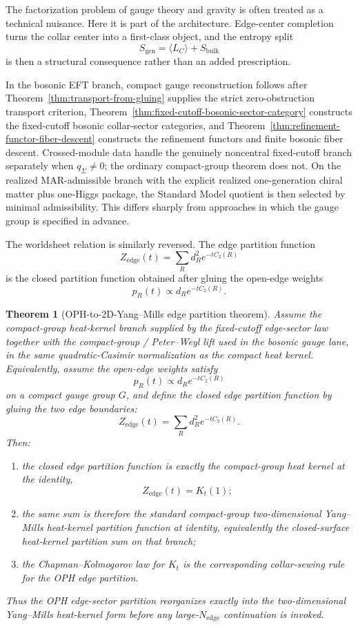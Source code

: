\documentclass[11pt]{article}
\newtheorem{theorem}{Theorem}[section]
\begin{document}
The factorization problem of gauge theory and gravity is often treated as a technical nuisance. Here it is part of the architecture. Edge-center completion turns the collar center into a first-class object, and the entropy split
\[
S_{\mathrm{gen}}=\langle L_C\rangle + S_{\mathrm{bulk}}
\]
is then a structural consequence rather than an added prescription.

In the bosonic EFT branch, compact gauge reconstruction follows after Theorem~\ref{thm:transport-from-gluing} supplies the strict zero-obstruction transport criterion, Theorem~\ref{thm:fixed-cutoff-bosonic-sector-category} constructs the fixed-cutoff bosonic collar-sector categories, and Theorem~\ref{thm:refinement-functor-fiber-descent} constructs the refinement functors and finite bosonic fiber descent. Crossed-module data handle the genuinely noncentral fixed-cutoff branch separately when \(q_\Sigma\ne0\); the ordinary compact-group theorem does not. On the realized MAR-admissible branch with the explicit realized one-generation chiral matter plus one-Higgs package, the Standard Model quotient is then selected by minimal admissibility. This differs sharply from approaches in which the gauge group is specified in advance.

The worldsheet relation is similarly reversed. The edge partition function
\[
Z_{\mathrm{edge}}(t)=\sum_R d_R^2 e^{-t C_2(R)}
\]
is the closed partition function obtained after gluing the open-edge weights
\[
p_R(t)\propto d_R e^{-tC_2(R)}.
\]

\begin{theorem}[OPH-to-2D-Yang--Mills edge partition theorem]\label{thm:edge-2dym}
Assume the compact-group heat-kernel branch supplied by the fixed-cutoff edge-sector law together
with the compact-group / Peter--Weyl lift used in the bosonic gauge lane, in the same
quadratic-Casimir normalization as the compact heat kernel. Equivalently, assume the open-edge
weights satisfy
\[
p_R(t)\propto d_R e^{-tC_2(R)}
\]
on a compact gauge group \(G\), and define the closed edge partition function by gluing the two
edge boundaries:
\[
Z_{\mathrm{edge}}(t)=\sum_R d_R^2 e^{-tC_2(R)}.
\]
Then:
\begin{enumerate}[label=\textup{(\roman*)},leftmargin=2em]
\item the closed edge partition function is exactly the compact-group heat kernel at the identity,
\[
Z_{\mathrm{edge}}(t)=K_t(1);
\]
\item the same sum is therefore the standard compact-group two-dimensional Yang--Mills
heat-kernel partition function at identity, equivalently the closed-surface heat-kernel partition
sum on that branch;
\item the Chapman--Kolmogorov law for \(K_t\) is the corresponding collar-sewing rule for the OPH
edge partition.
\end{enumerate}
Thus the OPH edge-sector partition reorganizes exactly into the two-dimensional Yang--Mills
heat-kernel form before any large-\(N_{\mathrm{edge}}\) continuation is invoked.
\end{theorem}
\end{document}
